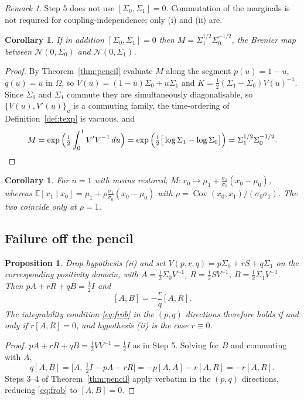 \documentclass[11pt]{article}
\newtheorem{proposition}[lemma]{Proposition}
\newtheorem{corollary}[lemma]{Corollary}
\theoremstyle{definition}
\theoremstyle{remark}
\newtheorem{remark}[lemma]{Remark}
\DeclareMathOperator{\Cov}{Cov}
\newcommand{\E}{\mathbb{E}}
\begin{document}
\begin{remark}\label{rem:notused}
Step 5 does not use $[\Sigma_0,\Sigma_1]=0$. Commutation of the marginals is not required for
coupling-independence; only (i) and (ii) are.
\end{remark}

\begin{corollary}\label{cor:brenier}
If in addition $[\Sigma_0,\Sigma_1]=0$ then $M=\Sigma_1^{1/2}\Sigma_0^{-1/2}$, the Brenier map
between $\mathcal N(0,\Sigma_0)$ and $\mathcal N(0,\Sigma_1)$.
\end{corollary}

\begin{proof}
By Theorem~\ref{thm:pencil} evaluate $M$ along the segment $p(u)=1-u$, $q(u)=u$ in $\Omega$, so
$V(u)=(1-u)\Sigma_0+u\Sigma_1$ and $K=\tfrac12(\Sigma_1-\Sigma_0)V(u)^{-1}$. Since $\Sigma_0$ and
$\Sigma_1$ commute they are simultaneously diagonalisable, so $\{V(u),V'(u)\}_u$ is a commuting
family, the time-ordering of Definition~\ref{def:texp} is vacuous, and
\[
M=\exp\Big(\tfrac12\int_0^1V'V^{-1}\,du\Big)
=\exp\Big(\tfrac12\big[\log\Sigma_1-\log\Sigma_0\big]\Big)=\Sigma_1^{1/2}\Sigma_0^{-1/2}. \qedhere
\]
\end{proof}

\begin{corollary}\label{cor:notbayes}
For $n=1$ with means restored, $M:x_0\mapsto\mu_1+\tfrac{\sigma_1}{\sigma_0}(x_0-\mu_0)$, whereas
$\E[x_1\mid x_0]=\mu_1+\rho\tfrac{\sigma_1}{\sigma_0}(x_0-\mu_0)$ with
$\rho=\Cov(x_0,x_1)/(\sigma_0\sigma_1)$. The two coincide only at $\rho=1$.
\end{corollary}

\subsection{Failure off the pencil}

\begin{proposition}\label{prop:obstruction}
Drop hypothesis \textup{(ii)} and set $V(p,r,q)=p\Sigma_0+rS+q\Sigma_1$ on the corresponding
positivity domain, with $A=\tfrac12\Sigma_0V^{-1}$, $R=\tfrac12SV^{-1}$, $B=\tfrac12\Sigma_1V^{-1}$.
Then $pA+rR+qB=\tfrac12I$ and
\[
[A,B]=-\frac{r}{q}[A,R].
\]
The integrability condition \eqref{eq:frob} in the $(p,q)$ directions therefore holds if and only
if $r[A,R]=0$, and hypothesis \textup{(ii)} is the case $r\equiv0$.
\end{proposition}

\begin{proof}
$pA+rR+qB=\tfrac12VV^{-1}=\tfrac12I$ as in Step 5. Solving for $B$ and commuting with $A$,
\[
q[A,B]=\Big[A,\ \tfrac12I-pA-rR\Big]=-p[A,A]-r[A,R]=-r[A,R].
\]
Steps 3--4 of Theorem~\ref{thm:pencil} apply verbatim in the $(p,q)$ directions, reducing
\eqref{eq:frob} to $[A,B]=0$.
\end{proof}
\end{document}
